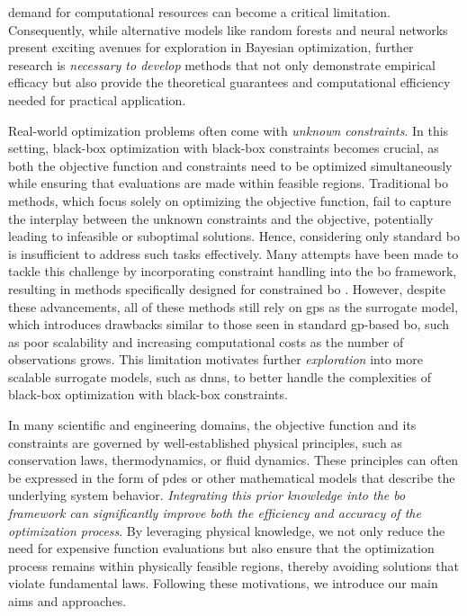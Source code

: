 demand for computational resources can become a critical limitation. Consequently, while alternative models like random forests and neural networks present exciting avenues for exploration in Bayesian optimization, further research is \textit{necessary to develop} methods that not only demonstrate empirical efficacy but also provide the theoretical guarantees and computational efficiency needed for practical application.

Real-world optimization problems often come with \textit{unknown constraints}. In this setting, black-box optimization with black-box constraints becomes crucial, as both the objective function and constraints need to be optimized simultaneously while ensuring that evaluations are made within feasible regions. Traditional \ac{bo} methods, which focus solely on optimizing the objective function, fail to capture the interplay between the unknown constraints and the objective, potentially leading to infeasible or suboptimal solutions. Hence, considering only standard \ac{bo} is insufficient to address such tasks effectively. Many attempts have been made to tackle this challenge by incorporating constraint handling into the \ac{bo} framework, resulting in methods specifically designed for constrained \ac{bo} \citep{gelbart2014bayesian, ariafar2019admmbo, nguyen2023optimistic}. However, despite these advancements, all of these methods still rely on \acp{gp} as the surrogate model, which introduces drawbacks similar to those seen in standard \ac{gp}-based \ac{bo}, such as poor scalability and increasing computational costs as the number of observations grows. This limitation motivates further \textit{exploration} into more scalable surrogate models, such as \acp{dnn}, to better handle the complexities of black-box optimization with black-box constraints.

In many scientific and engineering domains, the objective function and its constraints are governed by well-established physical principles, such as conservation laws, thermodynamics, or fluid dynamics. These principles can often be expressed in the form of \acp{pde} or other mathematical models that describe the underlying system behavior. \textit{Integrating this prior knowledge into the \ac{bo} framework can significantly improve both the efficiency and accuracy of the optimization process}. By leveraging physical knowledge, we not only reduce the need for expensive function evaluations but also ensure that the optimization process remains within physically feasible regions, thereby avoiding solutions that violate fundamental laws. Following these motivations, we introduce our main aims and approaches.


